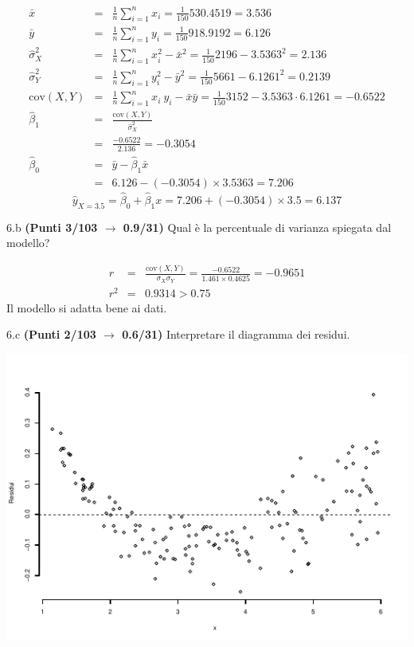 \documentclass[
  11pt,
]{book}
\theoremstyle{mytheoremstyle}
\theoremstyle{mydefstyle}
\newenvironment{sol}
  {
  \begin{tcolorbox}[enhanced,breakable,arc=0.1mm,boxrule=1pt,colback=white,colframe=iblue,
  title=\bf \fontfamily{lmss}\selectfont \hspace{.5 cm} Soluzione,drop fuzzy shadow]

}{
\end{tcolorbox}
  }
\begin{document}
\begin{sol}
\begin{eqnarray*}
           \bar x &=&\frac 1 n\sum_{i=1}^n x_i = \frac {1}{ 150 }  530.4519 =  3.536 \\
           \bar y &=&\frac 1 n\sum_{i=1}^n y_i = \frac {1}{ 150 }  918.9192 =  6.126 \\
           \hat\sigma_X^2&=&\frac 1 n\sum_{i=1}^n x_i^2-\bar x^2=\frac {1}{ 150 }  2196  - 3.5363 ^2= 2.136 \\
           \hat\sigma_Y^2&=&\frac 1 n\sum_{i=1}^n y_i^2-\bar y^2=\frac {1}{ 150 }  5661  - 6.1261 ^2= 0.2139 \\
           \text{cov}(X,Y)&=&\frac 1 n\sum_{i=1}^n x_i~y_i-\bar x\bar y=\frac {1}{ 150 }  3152 - 3.5363 \cdot 6.1261 = -0.6522 \\
           \hat\beta_1 &=& \frac{\text{cov}(X,Y)}{\hat\sigma_X^2} \\
                    &=& \frac{ -0.6522 }{ 2.136 }  =  -0.3054 \\
           \hat\beta_0 &=& \bar y - \hat\beta_1 \bar x\\
                    &=&  6.126 - (-0.3054) \times  3.5363 = 7.206 
         \end{eqnarray*}\[\hat y_{X= 3.5 }=\hat\beta_0+\hat\beta_1 x= 7.206 + (-0.3054) \times 3.5 = 6.137 \]

\end{sol}

6.b \textbf{(Punti 3/103 \(\rightarrow\) 0.9/31)} Qual è la percentuale di varianza spiegata dal modello?

\begin{sol}
\begin{eqnarray*}
r&=&\frac{\text{cov}(X,Y)}{\sigma_X\sigma_Y}=\frac{ -0.6522 }{ 1.461 \times 0.4625 }= -0.9651 \\r^2&=& 0.9314 > 0.75
\end{eqnarray*}
Il modello si adatta bene ai dati.

\end{sol}

6.c \textbf{(Punti 2/103 \(\rightarrow\) 0.6/31)} Interpretare il diagramma dei residui.

\begin{center}\includegraphics{Esami_passati_con_soluzioni_files/figure-latex/2023-18,-1} \end{center}
\end{document}

